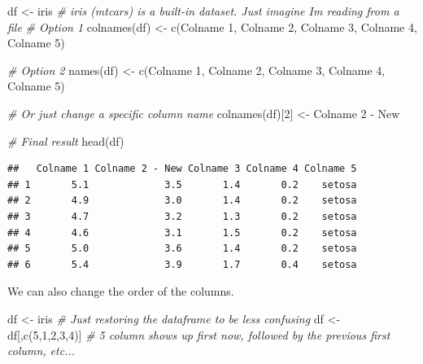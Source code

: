 \documentclass[
]{book}
\newenvironment{Shaded}{\begin{snugshade}}{\end{snugshade}}
\newcommand{\CommentTok}[1]{\textcolor[rgb]{0.56,0.35,0.01}{\textit{#1}}}
\newcommand{\DecValTok}[1]{\textcolor[rgb]{0.00,0.00,0.81}{#1}}
\newcommand{\FunctionTok}[1]{\textcolor[rgb]{0.00,0.00,0.00}{#1}}
\newcommand{\NormalTok}[1]{#1}
\newcommand{\OtherTok}[1]{\textcolor[rgb]{0.56,0.35,0.01}{#1}}
\newcommand{\StringTok}[1]{\textcolor[rgb]{0.31,0.60,0.02}{#1}}
\begin{document}
\begin{Shaded}
\begin{Highlighting}[]
\NormalTok{df }\OtherTok{\textless{}{-}}\NormalTok{ iris  }\CommentTok{\# iris (mtcars) is a built{-}in dataset. Just imagine I\textquotesingle{}m reading from a file}
\CommentTok{\# Option 1}
\FunctionTok{colnames}\NormalTok{(df) }\OtherTok{\textless{}{-}} \FunctionTok{c}\NormalTok{(}\StringTok{\textquotesingle{}Colname 1\textquotesingle{}}\NormalTok{, }\StringTok{\textquotesingle{}Colname 2\textquotesingle{}}\NormalTok{, }\StringTok{\textquotesingle{}Colname 3\textquotesingle{}}\NormalTok{, }\StringTok{\textquotesingle{}Colname 4\textquotesingle{}}\NormalTok{, }\StringTok{\textquotesingle{}Colname 5\textquotesingle{}}\NormalTok{)}

\CommentTok{\# Option 2}
\FunctionTok{names}\NormalTok{(df) }\OtherTok{\textless{}{-}} \FunctionTok{c}\NormalTok{(}\StringTok{\textquotesingle{}Colname 1\textquotesingle{}}\NormalTok{, }\StringTok{\textquotesingle{}Colname 2\textquotesingle{}}\NormalTok{, }\StringTok{\textquotesingle{}Colname 3\textquotesingle{}}\NormalTok{, }\StringTok{\textquotesingle{}Colname 4\textquotesingle{}}\NormalTok{, }\StringTok{\textquotesingle{}Colname 5\textquotesingle{}}\NormalTok{)}

\CommentTok{\# Or just change a specific column name}
\FunctionTok{colnames}\NormalTok{(df)[}\DecValTok{2}\NormalTok{] }\OtherTok{\textless{}{-}} \StringTok{\textquotesingle{}Colname 2 {-} New\textquotesingle{}}

\CommentTok{\# Final result}
\FunctionTok{head}\NormalTok{(df)}
\end{Highlighting}
\end{Shaded}

\begin{verbatim}
##   Colname 1 Colname 2 - New Colname 3 Colname 4 Colname 5
## 1       5.1             3.5       1.4       0.2    setosa
## 2       4.9             3.0       1.4       0.2    setosa
## 3       4.7             3.2       1.3       0.2    setosa
## 4       4.6             3.1       1.5       0.2    setosa
## 5       5.0             3.6       1.4       0.2    setosa
## 6       5.4             3.9       1.7       0.4    setosa
\end{verbatim}

We can also change the order of the columns.

\begin{Shaded}
\begin{Highlighting}[]
\NormalTok{df }\OtherTok{\textless{}{-}}\NormalTok{ iris }\CommentTok{\# Just restoring the dataframe to be less confusing}
\NormalTok{df }\OtherTok{\textless{}{-}}\NormalTok{ df[,}\FunctionTok{c}\NormalTok{(}\DecValTok{5}\NormalTok{,}\DecValTok{1}\NormalTok{,}\DecValTok{2}\NormalTok{,}\DecValTok{3}\NormalTok{,}\DecValTok{4}\NormalTok{)]  }\CommentTok{\# 5 column shows up first now, followed by the previous first column, etc...}
\end{Highlighting}
\end{Shaded}
\end{document}
